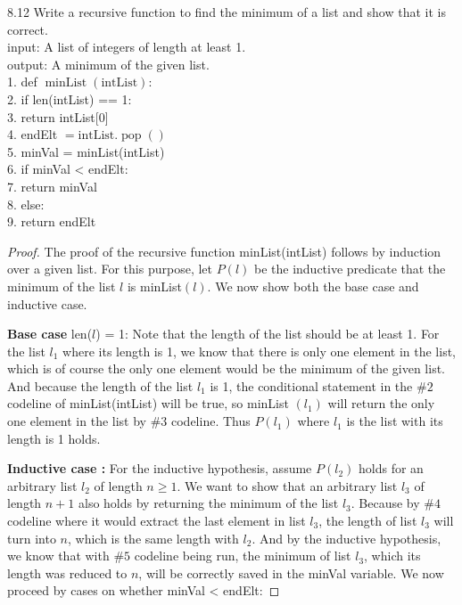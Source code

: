 \documentclass[10pt]{article}
\begin{document}
\begin{enumerate}[label={}]
          8.12 Write a recursive function to find the minimum of a list and show that it is correct.\\

          input: A list of integers of length at least 1.\\
          output: A minimum of the given list.\\
          1. def $\operatorname{minList}(\text{intList})$:\\
          2. \quad if len(intList) == 1:\\
          3. \quad \quad return intList[0]\\
          4. \quad endElt $= \text {intList.}\operatorname{pop}()$\\
          5. \quad minVal = minList(intList)\\
          6. \quad if minVal < endElt:\\
          7. \quad \quad return minVal\\
          8. \quad else:\\
          9. \quad \quad return endElt\\

          \begin{proof}

              The proof of the recursive function minList(intList) follows by induction over a given list. For this purpose, let $P(l)$ be the inductive predicate that the minimum of the list $l$ is minList$(l)$. We now show both the base case and inductive case.

              \textbf{Base case} len($l$) = 1: Note that the length of the list should be at least 1. For the list $l_1$ where its length is 1, we know that there is only one element in the list, which is of course the only one element would be the minimum of the given list. And because the length of the list $l_1$ is 1, the conditional statement in the $\# 2$ codeline of minList(intList) will be true, so minList $\left(l_1\right)$ will return the only one element in the list by \#3 codeline. Thus $P\left(l_1\right)$ where $l_1$ is the list with its length is 1 holds.

              \textbf{Inductive case :} For the inductive hypothesis, assume $P\left(l_2\right)$ holds for an arbitrary list $l_2$ of length $n \geq 1$. We want to show that an arbitrary list $l_3$ of length $n+1$ also holds by returning the minimum of the list $l_3$. Because by $\# 4$ codeline where it would extract the last element in list $l_3$, the length of list $l_3$ will turn into $n$, which is the same length with $l_2$. And by the inductive hypothesis, we know that with $\# 5$ codeline being run, the minimum of list $l_3$, which its length was reduced to $n$, will be correctly saved in the minVal variable.
              We now proceed by cases on whether minVal < endElt:


\end{proof}
\end{enumerate}
\end{document}
